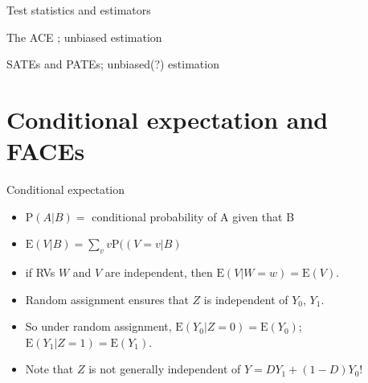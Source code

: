 \begin{frame}{Test statistics and estimators}
  
\end{frame}


\begin{frame}{The ACE ; unbiased estimation}
  
\end{frame}
\begin{frame}{SATEs and PATEs; unbiased(?) estimation}
  
\end{frame}


\section{Conditional expectation and FACEs}

\begin{frame}{Conditional expectation}
  
  \begin{itemize}
  \item $\mathrm{P}(A|B) =  $ conditional probability of A given that B
  \item $\mathrm{E}(V|B) = \sum_v v\mathrm{P} ((V=v|B)$
  \item if RVs $W$ and $V$ are independent, then $\mathrm{E}(V|W=w) = \mathrm{E}(V)$.
  \item Random assignment ensures that $Z$ is independent of $Y_0$, $Y_1$.
  \item So under random assignment, $\mathrm{E}(Y_0|Z=0) = \mathrm{E}(Y_0)$;  $\mathrm{E}(Y_1|Z=1) = \mathrm{E}(Y_1)$.
  \item Note that $Z$ is not generally independent of $Y=DY_1 + (1-D)Y_0$!
  \end{itemize}
\end{frame}

